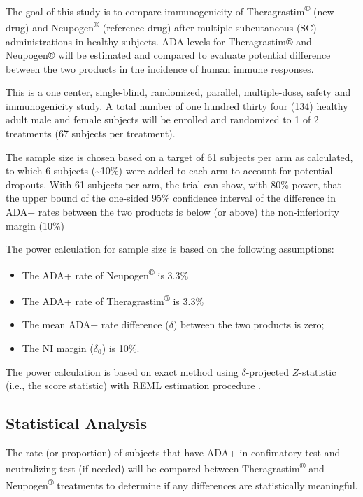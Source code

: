 \documentclass[]{article}
\providecommand{\tightlist}{%
  \setlength{\itemsep}{0pt}\setlength{\parskip}{0pt}}
\begin{document}
The goal of this study is to compare immunogenicity of
Theragrastim\textsuperscript{®} (new drug) and
Neupogen\textsuperscript{®} (reference drug) after multiple subcutaneous
(SC) administrations in healthy subjects. ADA levels for Theragrastim®
and Neupogen® will be estimated and compared to evaluate potential
difference between the two products in the incidence of human immune
responses.

This is a one center, single-blind, randomized, parallel, multiple-dose,
safety and immunogenicity study. A total number of one hundred thirty
four (134) healthy adult male and female subjects will be enrolled and
randomized to 1 of 2 treatments (67 subjects per treatment).

The sample size is chosen based on a target of 61 subjects per arm as
calculated, to which 6 subjects (\textasciitilde{}10\%) were added to
each arm to account for potential dropouts. With 61 subjects per arm,
the trial can show, with 80\% power, that the upper bound of the
one-sided 95\% confidence interval of the difference in ADA+ rates
between the two products is below (or above) the non-inferiority margin
(10\%)

The power calculation for sample size is based on the following
assumptions:

\begin{itemize}
\tightlist
\item
  The ADA+ rate of Neupogen\textsuperscript{®} is 3.3\%
\item
  The ADA+ rate of Theragrastim\textsuperscript{®} is 3.3\%
\item
  The mean ADA+ rate difference (\(\delta\)) between the two products is
  zero;
\item
  The NI margin (\(\delta_0\)) is 10\%.
\end{itemize}

The power calculation is based on exact method \citep{chan1999test}
using \(\delta\)-projected \(Z\)-statistic (i.e., the score statistic)
with REML estimation procedure \citep{miettinen1985comparative}.

\subsection{Statistical Analysis}\label{statistical-analysis}

The rate (or proportion) of subjects that have ADA+ in confimatory test
and neutralizing test (if needed) will be compared between
Theragrastim\textsuperscript{®} and Neupogen\textsuperscript{®}
treatments to determine if any differences are statistically meaningful.
\end{document}
